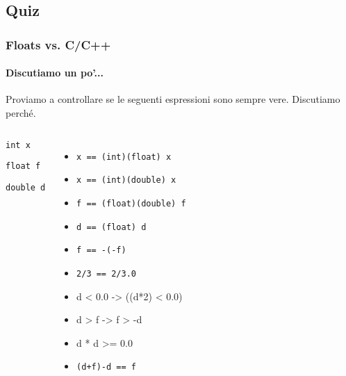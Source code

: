 \documentclass{beamer}
\begin{document}
  \subsection{Quiz}
  \begin{frame}
  	  \frametitle{Floats vs. C/C++}
    \framesubtitle{Discutiamo un po'...}
  	
    Proviamo a controllare se le seguenti espressioni sono sempre vere. Discutiamo perché.
        
    \vspace{1em}
    \begin{columns}
			\begin{center}
				\texttt{int x}
	
			  \texttt{float f}
				
				\texttt{double d}			
			\end{center}						
	    \begin{itemize}
	    		\item \texttt{x == (int)(float) x}
				\item \texttt{x == (int)(double) x}
				\item \texttt{f == (float)(double) f}
				\item \texttt{d == (float) d}
				\item \texttt{f == -(-f)}
				\item \texttt{2/3 == 2/3.0}
				\item d < 0.0 -> ((d*2) < 0.0)
				\item d > f -> f > -d
				\item d * d >= 0.0
				\item \texttt{(d+f)-d == f}
	    \end{itemize}
    \end{columns}
  \end{frame}
\end{document}
